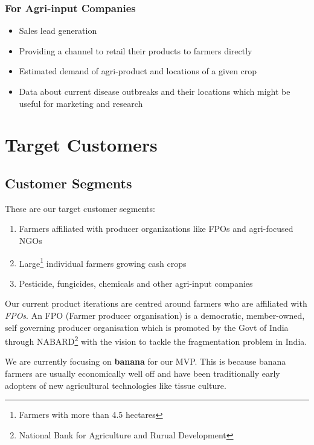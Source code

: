\documentclass[a4paper]{article}
\begin{document}
\subsubsection{For Agri-input Companies}
\begin{itemize}
\item Sales lead generation
\item Providing a channel to retail their products to farmers directly
\item Estimated demand of agri-product and locations of a given crop
\item Data about current disease outbreaks and their locations which might be useful for marketing and research
\end{itemize}


\section{Target Customers}
\subsection{Customer Segments}
These are our target customer segments: 

\begin{enumerate}
\item Farmers affiliated with producer organizations like FPOs and agri-focused NGOs
\item Large\footnote{Farmers with more than 4.5 hectares} individual farmers growing cash crops
\item Pesticide, fungicides, chemicals and other agri-input companies
\end{enumerate}

Our current product iterations are centred around farmers who are affiliated with \emph{FPOs}. An FPO (Farmer producer organisation) is a democratic, member-owned, self governing producer organisation which is promoted by the Govt of India through NABARD\footnote{National Bank for Agriculture and Rurual Development} with the vision to tackle the fragmentation problem in India.

We are currently focusing on \textbf{banana} for our MVP. This is because banana farmers are usually economically well off and have been traditionally early adopters of new agricultural technologies like tissue culture.
\end{document}
